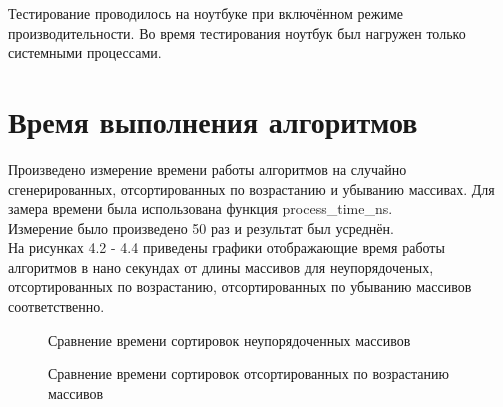 \documentclass[12pt]{report}
\begin{document}
Тестирование проводилось на ноутбуке при включённом режиме производительности. Во время тестирования ноутбук был нагружен только системными процессами.


\section{Время выполнения алгоритмов}
Произведено измерение времени работы алгоритмов на случайно сгенерированных, отсортированных по возрастанию и убыванию массивах. Для замера времени была использована функция process\_time\_ns.\\

Измерение было произведено 50 раз и результат был усреднён.\\

На рисунках 4.2 - 4.4 приведены графики отображающие время работы алгоритмов в нано секундах от длины массивов для неупорядоченых, отсортированных по возрастанию, отсортированных по убыванию массивов соответственно.


\begin{figure}[h]
	\centering
	\caption{Сравнение времени сортировок неупорядоченных массивов} \label{plot:NotSorted}
\end{figure}


\begin{figure}
	\centering
{}
\caption{Сравнение времени сортировок отсортированных по возрастанию массивов} 
\label{plot:SortedUp}
\end{figure}
\end{document}
